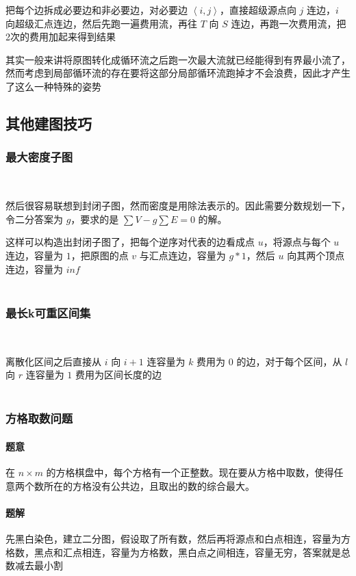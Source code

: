 	把每个边拆成必要边和非必要边，对必要边 $\left<i,j\right>$，直接超级源点向 $j$ 连边，$i$ 向超级汇点连边，然后先跑一遍费用流，再往 $T$ 向 $S$ 连边，再跑一次费用流，把2次的费用加起来得到结果
	
	其实一般来讲将原图转化成循环流之后跑一次最大流就已经能得到有界最小流了，然而考虑到局部循环流的存在要将这部分局部循环流跑掉才不会浪费，因此才产生了这么一种特殊的姿势
	\newpage
	\subsection{其他建图技巧}
	\subsubsection{最大密度子图}~
	
	然后很容易联想到封闭子图，然而密度是用除法表示的。因此需要分数规划一下，令二分答案为 $g$，要求的是 $\sum V-g\sum E=0$ 的解。
	
	这样可以构造出封闭子图了，把每个逆序对代表的边看成点 $u$，将源点与每个 $u$ 连边，容量为 $1$，把原图的点 $v$ 与汇点连边，容量为 $g*1$，然后 $u$ 向其两个顶点连边，容量为 $inf$\\
	
	~\\
	\subsubsection{最长k可重区间集}~
	
	离散化区间之后直接从 $i$ 向 $i+1$ 连容量为 $k$ 费用为 $0$ 的边，对于每个区间，从 $l$ 向 $r$ 连容量为 $1$ 费用为区间长度的边\\
	\\
	\subsubsection{方格取数问题}
	\paragraph{题意}在 $n\times m$ 的方格棋盘中，每个方格有一个正整数。现在要从方格中取数，使得任意两个数所在的方格没有公共边，且取出的数的综合最大。
	\paragraph{题解}先黑白染色，建立二分图，假设取了所有数，然后再将源点和白点相连，容量为方格数，黑点和汇点相连，容量为方格数，黑白点之间相连，容量无穷，答案就是总数减去最小割
%	
%
